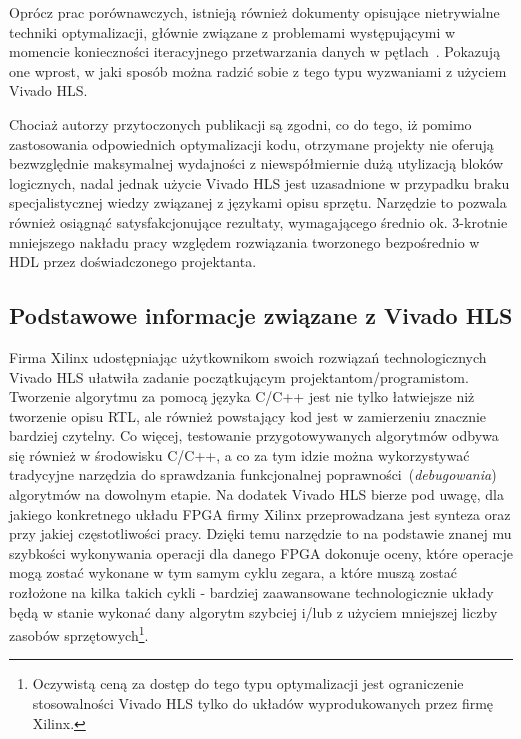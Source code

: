 Oprócz prac porównawczych, istnieją również dokumenty opisujące nietrywialne techniki optymalizacji, głównie związane z problemami występującymi w momencie konieczności iteracyjnego przetwarzania danych w pętlach~\cite{LOOP_PARALLELIZATION}\cite{HLS_HDL_MATRIX}. Pokazują one wprost, w jaki sposób można radzić sobie z tego typu wyzwaniami z użyciem Vivado HLS.

Chociaż autorzy przytoczonych publikacji są zgodni, co do tego, iż pomimo zastosowania odpowiednich optymalizacji kodu, otrzymane projekty nie oferują bezwzględnie maksymalnej wydajności z niewspółmiernie dużą utylizacją bloków logicznych, nadal jednak użycie Vivado HLS jest uzasadnione w przypadku braku specjalistycznej wiedzy związanej z językami opisu sprzętu. Narzędzie to pozwala również osiągnąć satysfakcjonujące rezultaty, wymagającego średnio ok. 3-krotnie mniejszego nakładu pracy względem rozwiązania tworzonego bezpośrednio w HDL przez doświadczonego projektanta.

\subsection{Podstawowe informacje związane z Vivado HLS}
Firma Xilinx udostępniając użytkownikom swoich rozwiązań technologicznych Vivado HLS ułatwiła zadanie początkującym projektantom/programistom. Tworzenie algorytmu za pomocą języka C/C++ jest nie tylko łatwiejsze niż tworzenie opisu RTL, ale również powstający kod jest w zamierzeniu znacznie bardziej czytelny. Co więcej, testowanie przygotowywanych algorytmów odbywa się również w środowisku C/C++, a co za tym idzie można wykorzystywać tradycyjne narzędzia do sprawdzania funkcjonalnej poprawności~(\textit{debugowania}) algorytmów na dowolnym etapie. Na dodatek Vivado HLS bierze pod uwagę, dla jakiego konkretnego układu FPGA firmy Xilinx przeprowadzana jest synteza oraz przy jakiej częstotliwości pracy. Dzięki temu narzędzie to na podstawie znanej mu szybkości wykonywania operacji dla danego FPGA dokonuje oceny, które operacje mogą zostać wykonane w tym samym cyklu zegara, a które muszą zostać rozłożone na kilka takich cykli - bardziej zaawansowane technologicznie układy będą w stanie wykonać dany algorytm szybciej i/lub z użyciem mniejszej liczby zasobów sprzętowych\footnote{Oczywistą ceną za dostęp do tego typu optymalizacji jest ograniczenie stosowalności Vivado HLS tylko do układów wyprodukowanych przez firmę Xilinx.}.

